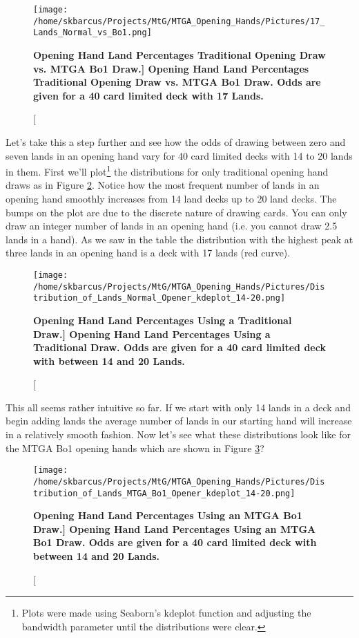 \documentclass[oneside]{book}   %
\begin{document}
 	\begin{figure}[!ht]
	\centering
	\centerline{\texttt{[image: /home/skbarcus/Projects/MtG/MTGA\_Opening\_Hands/Pictures/17\_Lands\_Normal\_vs\_Bo1.png]}}
	\caption[\bf{Opening Hand Land Percentages Traditional Opening Draw vs. MTGA Bo1 Draw.}]{
	{\bf{Opening Hand Land Percentages Traditional Opening Draw vs. MTGA Bo1 Draw.}} Odds are given for a 40 card limited deck with 17 Lands.}
	\label{fig:traditional_vs_bo1_17}
	\end{figure}	
	
Let's take this a step further and see how the odds of drawing between zero and seven lands in an opening hand vary for 40 card limited decks with 14 to 20 lands in them. First we'll plot\footnote{Plots were made using Seaborn's kdeplot function and adjusting the bandwidth parameter until the distributions were clear.} the distributions for only traditional opening hand draws as in Figure \ref{fig:traditional_distributions}. Notice how the most frequent number of lands in an opening hand smoothly increases from 14 land decks up to 20 land decks. The bumps on the plot are due to the discrete nature of drawing cards. You can only draw an integer number of lands in an opening hand (i.e. you cannot draw 2.5 lands in a hand). As we saw in the table the distribution with the highest peak at three lands in an opening hand is a deck with 17 lands (red curve).

 	\begin{figure}[!ht]
	\centering
	\centerline{\texttt{[image: /home/skbarcus/Projects/MtG/MTGA\_Opening\_Hands/Pictures/Distribution\_of\_Lands\_Normal\_Opener\_kdeplot\_14-20.png]}}
	\caption[\bf{Opening Hand Land Percentages Using a Traditional Draw.}]{
	{\bf{Opening Hand Land Percentages Using a Traditional Draw.}} Odds are given for a 40 card limited deck with between 14 and 20 Lands.}
	\label{fig:traditional_distributions}
	\end{figure}	

This all seems rather intuitive so far. If we start with only 14 lands in a deck and begin adding lands the average number of lands in our starting hand will increase in a relatively smooth fashion. Now let's see what these distributions look like for the MTGA Bo1 opening hands which are shown in Figure \ref{fig:bo1_distributions}? 

 	\begin{figure}[!ht]
	\centering
	\centerline{\texttt{[image: /home/skbarcus/Projects/MtG/MTGA\_Opening\_Hands/Pictures/Distribution\_of\_Lands\_MTGA\_Bo1\_Opener\_kdeplot\_14-20.png]}}
	\caption[\bf{Opening Hand Land Percentages Using an MTGA Bo1 Draw.}]{
	{\bf{Opening Hand Land Percentages Using an MTGA Bo1 Draw.}} Odds are given for a 40 card limited deck with between 14 and 20 Lands.}
	\label{fig:bo1_distributions}
	\end{figure}	
	
\end{document}
